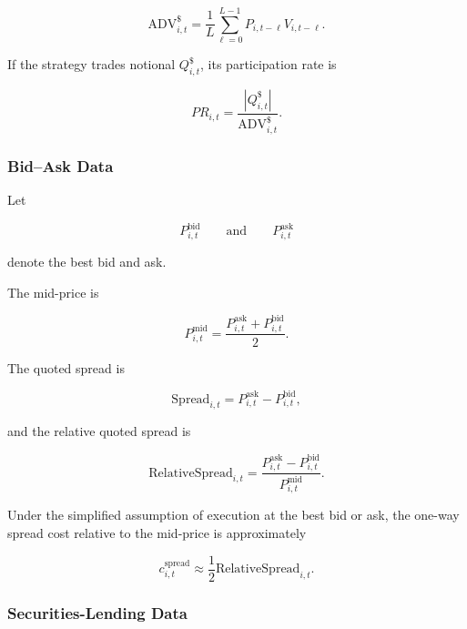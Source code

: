 \documentclass[11pt,a4paper]{article}
\begin{document}
\begin{equation}
\boxed{
\mathrm{ADV}_{i,t}^{\$}
=
\frac{1}{L}
\sum_{\ell=0}^{L-1}
P_{i,t-\ell}
V_{i,t-\ell}.
}
\end{equation}

If the strategy trades notional $Q_{i,t}^{\$}$, its participation rate is

\begin{equation}
\boxed{
PR_{i,t}
=
\frac{
|Q_{i,t}^{\$}|
}{
\mathrm{ADV}_{i,t}^{\$}
}.
}
\end{equation}


\subsubsection{Bid--Ask Data}

Let

\begin{equation}
P_{i,t}^{\mathrm{bid}}
\qquad\text{and}\qquad
P_{i,t}^{\mathrm{ask}}
\end{equation}

denote the best bid and ask.

The mid-price is

\begin{equation}
P_{i,t}^{\mathrm{mid}}
=
\frac{
P_{i,t}^{\mathrm{ask}}
+
P_{i,t}^{\mathrm{bid}}
}{2}.
\end{equation}

The quoted spread is

\begin{equation}
\mathrm{Spread}_{i,t}
=
P_{i,t}^{\mathrm{ask}}
-
P_{i,t}^{\mathrm{bid}},
\end{equation}

and the relative quoted spread is

\begin{equation}
\boxed{
\mathrm{RelativeSpread}_{i,t}
=
\frac{
P_{i,t}^{\mathrm{ask}}
-
P_{i,t}^{\mathrm{bid}}
}{
P_{i,t}^{\mathrm{mid}}
}.
}
\end{equation}

Under the simplified assumption of execution at the best bid or ask, the
one-way spread cost relative to the mid-price is approximately

\begin{equation}
c_{i,t}^{\mathrm{spread}}
\approx
\frac{1}{2}
\mathrm{RelativeSpread}_{i,t}.
\end{equation}


\subsubsection{Securities-Lending Data}
\end{document}

